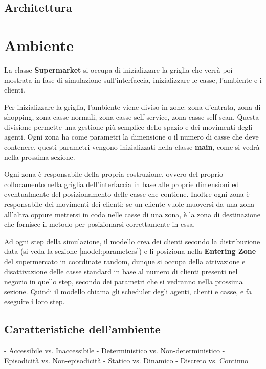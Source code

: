 \subsection{Architettura}

\section{Ambiente}
La classe \textbf{Supermarket} si occupa di inizializzare la griglia che verrà poi mostrata in fase di simulazione sull'interfaccia, inizializzare le casse, l'ambiente e i clienti.

Per inizializzare la griglia, l'ambiente viene diviso in zone: zona d'entrata, zona di shopping, zona casse normali, zona casse self-service, zona casse self-scan. Questa divisione permette una gestione più semplice dello spazio e dei movimenti degli agenti. Ogni zona ha come parametri la dimensione o il numero di casse che deve contenere, questi parametri vengono inizializzati nella classe \textbf{main}, come si vedrà nella prossima sezione.

Ogni zona è responsabile della propria costruzione, ovvero del proprio collocamento nella griglia dell'interfaccia in base alle proprie dimensioni ed eventualmente del posizionamento delle casse che contiene. Inoltre ogni zona è responsabile dei movimenti dei clienti: se un cliente vuole muoversi da una zona all'altra oppure mettersi in coda nelle casse di una zona, è la zona di destinazione che fornisce il metodo per posizionarsi correttamente in essa.

 Ad ogni step della simulazione, il modello crea dei clienti secondo la distribuzione data (si veda la sezione \ref{model:parameters}) e li posiziona nella \textbf{Entering Zone} del supermercato in coordinate random, dunque si occupa della attivazione e disattivazione delle casse standard in base al numero di clienti presenti nel negozio in quello step, secondo dei parametri che si vedranno nella prossima sezione. Quindi il modello chiama gli scheduler degli agenti, clienti e casse, e fa eseguire i loro step.

\subsection{Caratteristiche dell'ambiente}
- Accessibile vs. Inaccessibile
- Deterministico vs. Non-deterministico
- Episodicità vs. Non-episodicità
- Statico vs. Dinamico
- Discreto vs. Continuo


